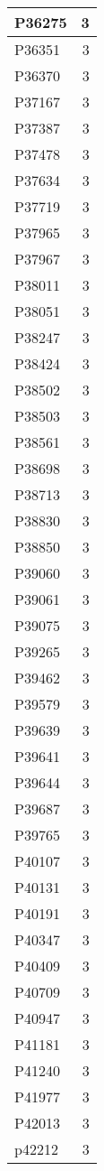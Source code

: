 \documentclass[
]{book}
\theoremstyle{definition}
\theoremstyle{definition}
\theoremstyle{definition}
\theoremstyle{definition}
\theoremstyle{remark}
\begin{document}
\begin{table}
\begin{tabular}{l|r}
\hline
P36275 & 3\\
\hline
P36351 & 3\\
\hline
P36370 & 3\\
\hline
P37167 & 3\\
\hline
P37387 & 3\\
\hline
P37478 & 3\\
\hline
P37634 & 3\\
\hline
P37719 & 3\\
\hline
P37965 & 3\\
\hline
P37967 & 3\\
\hline
P38011 & 3\\
\hline
P38051 & 3\\
\hline
P38247 & 3\\
\hline
P38424 & 3\\
\hline
P38502 & 3\\
\hline
P38503 & 3\\
\hline
P38561 & 3\\
\hline
P38698 & 3\\
\hline
P38713 & 3\\
\hline
P38830 & 3\\
\hline
P38850 & 3\\
\hline
P39060 & 3\\
\hline
P39061 & 3\\
\hline
P39075 & 3\\
\hline
P39265 & 3\\
\hline
P39462 & 3\\
\hline
P39579 & 3\\
\hline
P39639 & 3\\
\hline
P39641 & 3\\
\hline
P39644 & 3\\
\hline
P39687 & 3\\
\hline
P39765 & 3\\
\hline
P40107 & 3\\
\hline
P40131 & 3\\
\hline
P40191 & 3\\
\hline
P40347 & 3\\
\hline
P40409 & 3\\
\hline
P40709 & 3\\
\hline
P40947 & 3\\
\hline
P41181 & 3\\
\hline
P41240 & 3\\
\hline
P41977 & 3\\
\hline
P42013 & 3\\
\hline
p42212 & 3\\

\end{tabular}
\end{table}
\end{document}
